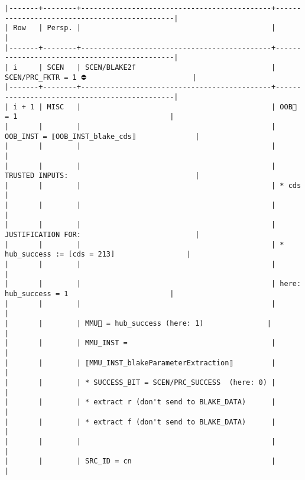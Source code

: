 \documentclass[varwidth=\maxdimen,margin=0.5cm,multi={verbatim}]{standalone}
\begin{document}
\begin{verbatim}
|-------+--------+---------------------------------------------+----------------------------------------------|
| Row   | Persp. |                                             |                                              |
|-------+--------+---------------------------------------------+----------------------------------------------|
| i     | SCEN   | SCEN/BLAKE2f                                | SCEN/PRC_FKTR = 1 ⛔                         |
|-------+--------+---------------------------------------------+----------------------------------------------|
| i + 1 | MISC   |                                             | OOB🏴 = 1                                    |
|       |        |                                             | OOB_INST = ⟦OOB_INST_blake_cds⟧              |
|       |        |                                             |                                              |
|       |        |                                             | TRUSTED INPUTS:                              |
|       |        |                                             | * cds                                        |
|       |        |                                             |                                              |
|       |        |                                             | JUSTIFICATION FOR:                           |
|       |        |                                             | * hub_success := [cds = 213]                 |
|       |        |                                             |                                              |
|       |        |                                             | here: hub_success = 1                        |
|       |        |                                             |                                              |
|       |        | MMU🏴 = hub_success (here: 1)               |                                              |
|       |        | MMU_INST =                                  |                                              |
|       |        | ⟦MMU_INST_blakeParameterExtraction⟧         |                                              |
|       |        | * SUCCESS_BIT = SCEN/PRC_SUCCESS  (here: 0) |                                              |
|       |        | * extract r (don't send to BLAKE_DATA)      |                                              |
|       |        | * extract f (don't send to BLAKE_DATA)      |                                              |
|       |        |                                             |                                              |
|       |        | SRC_ID = cn                                 |                                              |

\end{verbatim}
\end{document}
